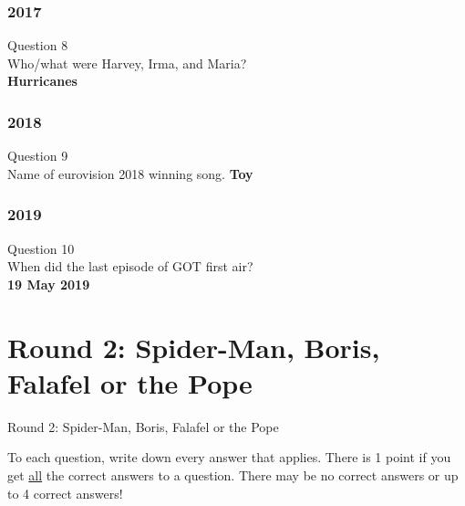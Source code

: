 \documentclass{beamer}
\begin{document}
\begin{frame}
\frametitle{2017}
Question 8\\
Who/what were Harvey, Irma, and Maria?\\

\textbf{Hurricanes}
\end{frame}


\begin{frame}
\frametitle{2018}
Question 9\\
Name of eurovision 2018 winning song.
\textbf{Toy}
\end{frame}



\begin{frame}
\frametitle{2019}
Question 10\\
When did the last episode of GOT first air?\\
\textbf{19 May 2019}
\end{frame}


\section{Round 2: Spider-Man, Boris, Falafel or the Pope}

\begin{frame}
\centering
\Huge
Round 2: Spider-Man, Boris, Falafel or the Pope\vspace{20pt}

\small
To each question, write down every answer that applies. There is 1 point if you get \underline{all} the correct answers to a question. \newline 
There may be no correct answers or up to 4 correct answers!
\end{frame}
\end{document}
